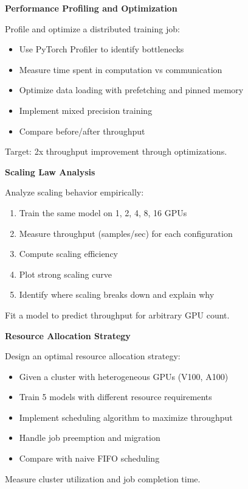 \begin{exercise}
\textbf{Performance Profiling and Optimization}

Profile and optimize a distributed training job:
\begin{itemize}
    \item Use PyTorch Profiler to identify bottlenecks
    \item Measure time spent in computation vs communication
    \item Optimize data loading with prefetching and pinned memory
    \item Implement mixed precision training
    \item Compare before/after throughput
\end{itemize}

Target: 2x throughput improvement through optimizations.
\end{exercise}

\begin{exercise}
\textbf{Scaling Law Analysis}

Analyze scaling behavior empirically:
\begin{enumerate}
    \item Train the same model on 1, 2, 4, 8, 16 GPUs
    \item Measure throughput (samples/sec) for each configuration
    \item Compute scaling efficiency
    \item Plot strong scaling curve
    \item Identify where scaling breaks down and explain why
\end{enumerate}

Fit a model to predict throughput for arbitrary GPU count.
\end{exercise}

\begin{exercise}
\textbf{Resource Allocation Strategy}

Design an optimal resource allocation strategy:
\begin{itemize}
    \item Given a cluster with heterogeneous GPUs (V100, A100)
    \item Train 5 models with different resource requirements
    \item Implement scheduling algorithm to maximize throughput
    \item Handle job preemption and migration
    \item Compare with naive FIFO scheduling
\end{itemize}

Measure cluster utilization and job completion time.
\end{exercise}
